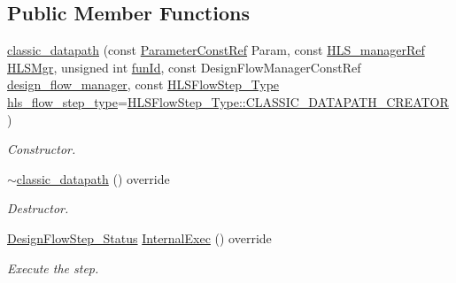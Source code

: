\subsection*{Public Member Functions}
\begin{DoxyCompactItemize}
\item 
\hyperlink{classclassic__datapath_a7ea2b03fd17599b8578d7f403642f0aa}{classic\+\_\+datapath} (const \hyperlink{Parameter_8hpp_a37841774a6fcb479b597fdf8955eb4ea}{Parameter\+Const\+Ref} Param, const \hyperlink{hls__manager_8hpp_acd3842b8589fe52c08fc0b2fcc813bfe}{H\+L\+S\+\_\+manager\+Ref} \hyperlink{classHLS__step_ade85003a99d34134418451ddc46a18e9}{H\+L\+S\+Mgr}, unsigned int \hyperlink{classHLSFunctionStep_a3e6434fd86c698b0c70520b859bff5b0}{fun\+Id}, const Design\+Flow\+Manager\+Const\+Ref \hyperlink{classDesignFlowStep_ab770677ddf087613add30024e16a5554}{design\+\_\+flow\+\_\+manager}, const \hyperlink{hls__step_8hpp_ada16bc22905016180e26fc7e39537f8d}{H\+L\+S\+Flow\+Step\+\_\+\+Type} \hyperlink{classHLS__step_aefd59af15346ec3f10bf12bd756e6777}{hls\+\_\+flow\+\_\+step\+\_\+type}=\hyperlink{hls__step_8hpp_ada16bc22905016180e26fc7e39537f8dab8c079f2d09577111672eaff242d7a56}{H\+L\+S\+Flow\+Step\+\_\+\+Type\+::\+C\+L\+A\+S\+S\+I\+C\+\_\+\+D\+A\+T\+A\+P\+A\+T\+H\+\_\+\+C\+R\+E\+A\+T\+OR})
\begin{DoxyCompactList}\small\item\em Constructor. \end{DoxyCompactList}\item 
\hyperlink{classclassic__datapath_a4bf2c606d9fb0d24af66e1589ad5b4e3}{$\sim$classic\+\_\+datapath} () override
\begin{DoxyCompactList}\small\item\em Destructor. \end{DoxyCompactList}\item 
\hyperlink{design__flow__step_8hpp_afb1f0d73069c26076b8d31dbc8ebecdf}{Design\+Flow\+Step\+\_\+\+Status} \hyperlink{classclassic__datapath_a2630a430a4a5513d7d6ce4b8a37b3dff}{Internal\+Exec} () override
\begin{DoxyCompactList}\small\item\em Execute the step. \end{DoxyCompactList}\end{DoxyCompactItemize}
